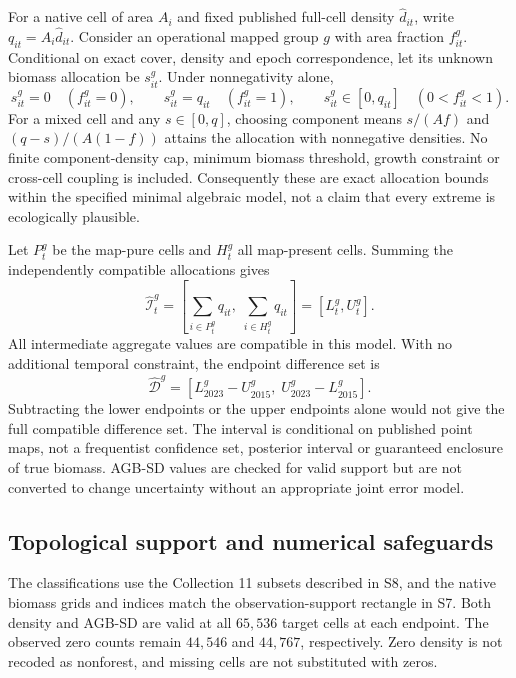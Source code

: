 \documentclass[11pt,a4paper]{article}
\begin{document}
For a native cell of area $A_i$ and fixed published full-cell density $\widehat d_{it}$, write $q_{it}=A_i\widehat d_{it}$. Consider an operational mapped group $g$ with area fraction $f_{it}^g$. Conditional on exact cover, density and epoch correspondence, let its unknown biomass allocation be $s_{it}^g$. Under nonnegativity alone,
\begin{equation}
s_{it}^g=0\quad(f_{it}^g=0),\qquad
s_{it}^g=q_{it}\quad(f_{it}^g=1),\qquad
s_{it}^g\in[0,q_{it}]\quad(0<f_{it}^g<1).
\end{equation}
For a mixed cell and any $s\in[0,q]$, choosing component means $s/(Af)$ and $(q-s)/(A(1-f))$ attains the allocation with nonnegative densities. No finite component-density cap, minimum biomass threshold, growth constraint or cross-cell coupling is included. Consequently these are exact allocation bounds within the specified minimal algebraic model, not a claim that every extreme is ecologically plausible.

Let $P_t^g$ be the map-pure cells and $H_t^g$ all map-present cells. Summing the independently compatible allocations gives
\begin{equation}
\widehat{\mathcal I}_t^g=\left[\sum_{i\in P_t^g}q_{it},\;\sum_{i\in H_t^g}q_{it}\right]=[L_t^g,U_t^g].
\end{equation}
All intermediate aggregate values are compatible in this model. With no additional temporal constraint, the endpoint difference set is
\begin{equation}
\widehat{\mathcal D}^g=[L_{2023}^g-U_{2015}^g,\;U_{2023}^g-L_{2015}^g].
\end{equation}
Subtracting the lower endpoints or the upper endpoints alone would not give the full compatible difference set. The interval is conditional on published point maps, not a frequentist confidence set, posterior interval or guaranteed enclosure of true biomass. AGB-SD values are checked for valid support but are not converted to change uncertainty without an appropriate joint error model.

\subsection{Topological support and numerical safeguards}
The classifications use the Collection 11 subsets described in S8, and the native biomass grids and indices match the observation-support rectangle in S7. Both density and AGB-SD are valid at all $65{,}536$ target cells at each endpoint. The observed zero counts remain $44{,}546$ and $44{,}767$, respectively. Zero density is not recoded as nonforest, and missing cells are not substituted with zeros.
\end{document}
